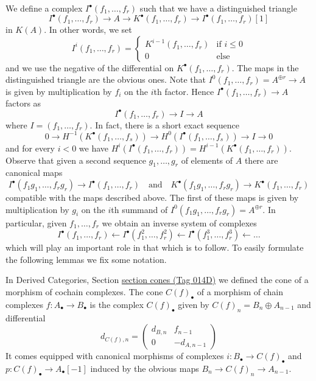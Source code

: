 \documentclass{amsart}
\theoremstyle{plain}
\theoremstyle{definition}
\theoremstyle{remark}
\numberwithin{equation}{subsection}
\begin{document}
\medskip\noindent
We define a complex $I^\bullet(f_1, \ldots, f_r)$
such that we have a distinguished triangle
$$
I^\bullet(f_1, \ldots, f_r) \to
A \to
K^\bullet(f_1, \ldots, f_r) \to
I^\bullet(f_1, \ldots, f_r)[1]
$$
in $K(A)$.
In other words, we set
$$
I^i(f_1, \ldots, f_r) =
\left\{
\begin{matrix}
K^{i - 1}(f_1, \ldots, f_r) & \text{if } i \leq 0 \\
0 & \text{else}
\end{matrix}
\right.
$$
and we use the negative of the differential on $K^\bullet(f_1, \ldots, f_r)$.
The maps in the distinguished triangle are the obvious ones. Note that
$I^0(f_1, \ldots, f_r) = A^{\oplus r} \to A$ is given by
multiplication by $f_i$ on the $i$th factor.
Hence $I^\bullet(f_1, \ldots, f_r) \to A$ factors as
$$
I^\bullet(f_1, \ldots, f_r) \to I \to A
$$
where $I = (f_1, \ldots, f_r)$. In fact, there is a short exact sequence
$$
0 \to H^{-1}(K^\bullet(f_1, \ldots, f_s)) \to
H^0(I^\bullet(f_1, \ldots, f_s)) \to I \to 0
$$
and for every $i < 0$ we have
$H^i(I^\bullet(f_1, \ldots, f_r)) = H^{i - 1}(K^\bullet(f_1, \ldots, f_r))$.
Observe that given a second sequence $g_1, \ldots, g_r$ of elements of $A$
there are canonical maps
$$
I^\bullet(f_1g_1, \ldots, f_rg_r) \to I^\bullet(f_1, \ldots, f_r)
\quad\text{and}\quad
K^\bullet(f_1g_1, \ldots, f_rg_r) \to K^\bullet(f_1, \ldots, f_r)
$$
compatible with the maps described above. The first of these maps is
given by multiplication by $g_i$ on the $i$th summand of
$I^0(f_1g_1, \ldots, f_rg_r) = A^{\oplus r}$. In particular, given
$f_1, \ldots, f_r$ we obtain an inverse system of complexes
\begin{equation}
\label{equation-system}
I^\bullet(f_1, \ldots, f_r) \leftarrow
I^\bullet(f_1^2, \ldots, f_r^2) \leftarrow
I^\bullet(f_1^3, \ldots, f_r^3) \leftarrow \ldots
\end{equation}
which will play an important role in that which is to follow.
To easily formulate the following lemmas we fix some notation.


\noindent
In
Derived Categories, Section \href{https://stacks.math.columbia.edu/tag/014D}{section cones (Tag 014D)}
we defined the cone of a morphism of cochain complexes.
The cone $C(f)_\bullet$ of a morphism of chain complexes
$f : A_\bullet \to B_\bullet$ is the complex $C(f)_\bullet$ given by
$C(f)_n = B_n \oplus A_{n - 1}$ and differential
\begin{equation}
\label{more-algebra-equation-differential-cone}
d_{C(f), n} =
\left(
\begin{matrix}
d_{B, n} & f_{n - 1} \\
0 & -d_{A, n - 1}
\end{matrix}
\right)
\end{equation}
It comes equipped with canonical morphisms of complexes
$i : B_\bullet \to C(f)_\bullet$ and
$p : C(f)_\bullet \to A_\bullet[-1]$
induced by the obvious maps $B_n \to C(f)_n \to A_{n - 1}$.
\end{document}
